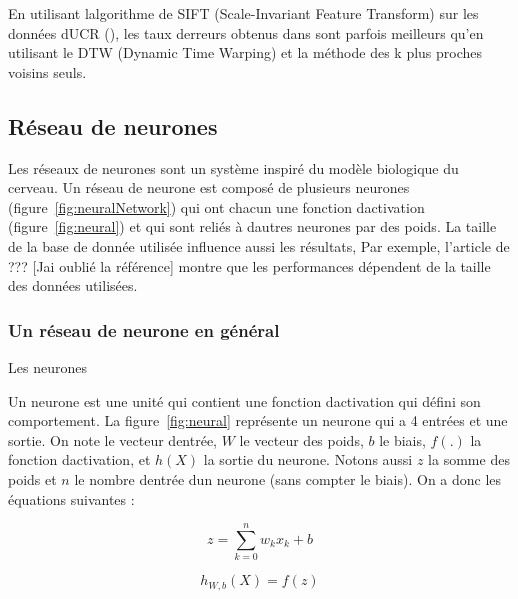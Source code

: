 \documentclass[11pt]{sdm}
\begin{document}
			En utilisant l\textquotesingle algorithme de SIFT (Scale-Invariant Feature Transform) sur les donn\'ees d\textquotesingle UCR (\cite{UCRArchive}), les taux d\textquotesingle erreurs obtenus dans \cite{bailly2015bag} sont parfois meilleurs qu'en utilisant le DTW (Dynamic Time Warping) et la m\'ethode des k plus proches voisins seuls.

	\subsection{R\'eseau de neurones}
		Les r\'eseaux de neurones sont un syst\`eme inspir\'e du mod\`ele biologique du cerveau. Un r\'eseau de neurone est compos\'e de plusieurs neurones (figure~\ref{fig:neuralNetwork}) qui ont chacun une fonction d\textquotesingle activation (figure~\ref{fig:neural}) et qui sont reli\'es \`a d\textquotesingle autres neurones par des poids.
		La taille de la base de donn\'ee utilis\'ee influence aussi les r\'esultats, Par exemple, l'article de ??? [J\textquotesingle ai oubli\'e la r\'ef\'erence] montre que les performances d\'ependent de la taille des donn\'ees utilis\'ees.

		\subsubsection{Un r\'eseau de neurone en g\'en\'eral}
			\begin{itshape}Les neurones\end{itshape}
			\smallbreak
			Un neurone est une unit\'e qui contient une fonction d\textquotesingle activation qui d\'efini son comportement. La figure~\ref{fig:neural} repr\'esente un neurone qui a 4 entr\'ees et une sortie. On note  le vecteur d\textquotesingle entr\'ee, \textbf{$W$} le vecteur des poids, $b$ le biais, $f(.)$ la fonction d\textquotesingle activation, et $h(X)$ la sortie du neurone. Notons aussi $z$ la somme des poids et $n$ le nombre d\textquotesingle entr\'ee d\textquotesingle un neurone (sans compter le biais). On a donc les \'equations suivantes :
			
			\begin{equation}
				z = \sum_{k=0}^n w_k x_k + b
				\label{eq:z}
			\end{equation}

			\begin{equation}
				h_{W,b}(X) = f(z)
				\label{eq:h}
			\end{equation}
\end{document}
